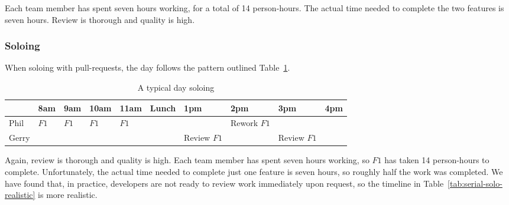 \documentclass[letterpaper]{article}
\theoremstyle{definition}
\begin{document}
    Each team member has spent seven hours working, for a total of 14 person-hours.
    The actual time needed to complete the two features is seven hours.
    Review is thorough and quality is high.

    \subsubsection{Soloing}\label{subsubsec:serial-soloing}

    When soloing with pull-requests, the day follows the pattern outlined Table~\ref{tab:serial-solo}.

    \begin{table}[h]
        \centering
        \tiny
        \begin{tabular}{ |l|l|l|l|l|l|l|l|l|l| }
            \hline
            & 8am                     & 9am                     & 10am                    & 11am                    & Lunch & 1pm                            & 2pm                            & 3pm                            & 4pm \\
            \hline
            Phil  & \cellcolor{blue!10}$F1$ & \cellcolor{blue!10}$F1$ & \cellcolor{blue!10}$F1$ & \cellcolor{blue!10}$F1$ &       &        & \cellcolor{blue!10}Rework $F1$ &        &     \\
            \hline
            Gerry &                         &                         &                         &                         &       & \cellcolor{blue!10}Review $F1$ &                                & \cellcolor{blue!10}Review $F1$ &     \\
            \hline
        \end{tabular}
        \caption{A typical day soloing}
        \label{tab:serial-solo}
    \end{table}

    Again, review is thorough and quality is high.
    Each team member has spent seven hours working, so $F1$ has taken 14 person-hours to complete.
    Unfortunately, the actual time needed to complete just one feature is seven hours, so roughly half the work was
    completed.
    We have found that, in practice, developers are not ready to review work immediately upon request,
    so the timeline in Table~\ref{tab:serial-solo-realistic} is more realistic.
\end{document}
